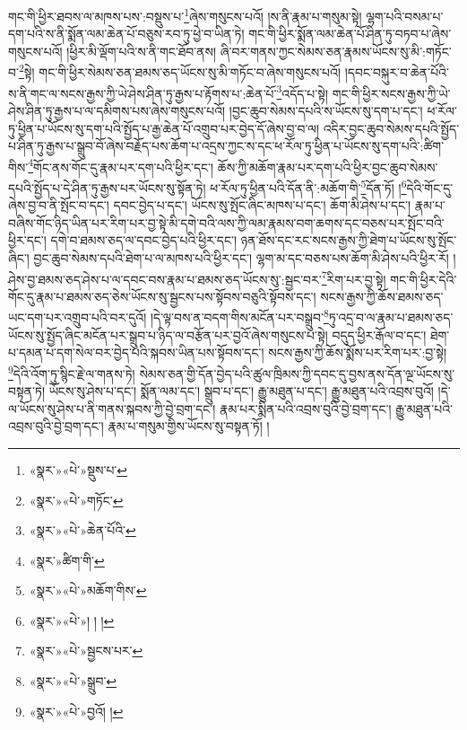 གང་གི་ཕྱིར་ཐབས་ལ་མཁས་པས་:བསྡུས་པ་\footnote{«སྣར་»«པེ་»སྡུས་པ་}ཞེས་གསུངས་པའོ། །ས་ནི་རྣམ་པ་གསུམ་སྟེ། ལྷག་པའི་བསམ་པ་དག་པའི་ས་ནི་སྨོན་ལམ་ཆེན་པོ་བཅུས་རབ་ཏུ་ཕྱེ་བ་ཡིན་ཏེ། གང་གི་ཕྱིར་སྨོན་ལམ་ཆེན་པོ་ཤིན་ཏུ་བཏབ་པ་ཞེས་གསུངས་པའོ། །ཕྱིར་མི་ལྡོག་པའི་ས་ནི་གང་ཐོབ་ནས། ཞི་བར་གནས་ཀྱང་སེམས་ཅན་རྣམས་ཡོངས་སུ་མི་:གཏོང་བ་\footnote{«སྣར་»«པེ་»གཏོང་}སྟེ། གང་གི་ཕྱིར་སེམས་ཅན་ཐམས་ཅད་ཡོངས་སུ་མི་གཏོང་བ་ཞེས་གསུངས་པའོ། །དབང་བསྐུར་བ་ཆེན་པོའི་ས་ནི་གང་ལ་སངས་རྒྱས་ཀྱི་ཡེ་ཤེས་ཤིན་ཏུ་རྒྱས་པ་རྟོགས་པ་:ཆེན་པོ་\footnote{«སྣར་»«པེ་»ཆེན་པོའི་}འདོད་པ་སྟེ། གང་གི་ཕྱིར་སངས་རྒྱས་ཀྱི་ཡེ་ཤེས་ཤིན་ཏུ་རྒྱས་པ་ལ་དམིགས་པས་ཞེས་གསུངས་པའོ། །བྱང་ཆུབ་སེམས་དཔའི་ས་ཡོངས་སུ་དག་པ་དང་། ཕ་རོལ་ཏུ་ཕྱིན་པ་ཡོངས་སུ་དག་པའི་སྤྱོད་པ་རྒྱ་ཆེན་པོ་འགྲུབ་པར་བྱེད་དོ་ཞེས་བྱ་བ་ལ། འདིར་བྱང་ཆུབ་སེམས་དཔའི་སྤྱོད་པ་ཤིན་ཏུ་རྒྱས་པ་སྒྲུབ་བོ་ཞེས་བརྗོད་པས་ཆོག་པ་འདྲས་ཀྱང་ས་དང་ཕ་རོལ་ཏུ་ཕྱིན་པ་ཡོངས་སུ་དག་པའི་:ཚིག་གིས་\footnote{«སྣར་»ཚིག་གི་}གོང་ནས་གོང་དུ་རྣམ་པར་དག་པའི་ཕྱིར་དང་། ཆོས་ཀྱི་མཆོག་རྣམ་པར་དག་པའི་ཕྱིར་བྱང་ཆུབ་སེམས་དཔའི་སྤྱོད་པ་དེ་ཤིན་ཏུ་རྒྱས་པར་ཡོངས་སུ་སྟོན་ཏེ། ཕ་རོལ་ཏུ་ཕྱིན་པའི་དོན་ནི་:མཆོག་གི་\footnote{«སྣར་»«པེ་»མཆོག་གིས་}དོན་ཏོ། །\footnote{«སྣར་»«པེ་»། ། །}དེའི་གོང་དུ་ཞེས་བྱ་བ་ནི་སྤོང་བ་དང་། དབང་བྱེད་པ་དང་། ཡོངས་སུ་སྤོང་ཞིང་མཁས་པ་དང་། ཆོག་མི་ཤེས་པ་དང་། རྣམ་པ་བཞིས་གོང་ཉིད་ཡིན་པར་རིག་པར་བྱ་སྟེ་མི་དགེ་བའི་ལས་ཀྱི་ལམ་རྣམས་བག་ཆགས་དང་བཅས་པར་སྤོང་བའི་ཕྱིར་དང་། དགེ་བ་ཐམས་ཅད་ལ་དབང་བྱེད་པའི་ཕྱིར་དང་། ཉན་ཐོས་དང་རང་སངས་རྒྱས་ཀྱི་ཐེག་པ་ཡོངས་སུ་སྤོང་ཞིང་། བྱང་ཆུབ་སེམས་དཔའི་ཐེག་པ་ལ་མཁས་པའི་ཕྱིར་དང་། ལྷག་མ་དང་བཅས་པས་ཆོག་མི་ཤེས་པའི་ཕྱིར་རོ། །ཤེས་བྱ་ཐམས་ཅད་ཤེས་པ་ལ་དབང་བས་རྣམ་པ་ཐམས་ཅད་ཡོངས་སུ་:སྦྱང་བར་\footnote{«སྣར་»«པེ་»སྦྱངས་པར་}རིག་པར་བྱ་སྟེ། གང་གི་ཕྱིར་དེའི་གོང་དུ་རྣམ་པ་ཐམས་ཅད་ཅེས་ཡོངས་སུ་སྦྱངས་པས་སྟོབས་བཅུའི་སྟོབས་དང་། སངས་རྒྱས་ཀྱི་ཆོས་ཐམས་ཅད་ཡང་དག་པར་འགྲུབ་པའི་བར་དུའོ། །དེ་ལྟ་བས་ན་བདག་གིས་མངོན་པར་བསྒྲུབ་\footnote{«སྣར་»«པེ་»སྒྲུབ་}ཏུ་འདྲ་བ་ལ་རྣམ་པ་ཐམས་ཅད་ཡོངས་སུ་སྤྱོད་ཞིང་མངོན་པར་སྒྲུབ་པ་ཉིད་ལ་བརྩོན་པར་བྱའོ་ཞེས་གསུངས་པ་སྟེ། བདུད་ཕྱིར་རྒོལ་བ་དང་། ཐེག་པ་དམན་པ་དག་སེལ་བར་བྱེད་པའི་སྐབས་ཡིན་པས་སྟོབས་དང་། སངས་རྒྱས་ཀྱི་ཆོས་སྨོས་པར་རིག་པར་:བྱ་སྟེ། \footnote{«སྣར་»«པེ་»བྱའོ། ། }དེའི་འོག་ཏུ་སྙིང་རྗེ་ལ་གནས་ཏེ། སེམས་ཅན་གྱི་དོན་བྱེད་པའི་ཚུལ་ཁྲིམས་ཀྱི་དབང་དུ་བྱས་ནས་དོན་ལྔ་ཡོངས་སུ་བསྟན་ཏེ། ཡོངས་སུ་ཤེས་པ་དང་། སྨོན་ལམ་དང་། སྒྲུབ་པ་དང་། རྒྱུ་མཐུན་པ་དང་། རྒྱུ་མཐུན་པའི་འབྲས་བུའོ། །དེ་ལ་ཡོངས་སུ་ཤེས་པ་ནི་གནས་སྐབས་ཀྱི་བྱེ་བྲག་དང་། རྣམ་པར་སྨིན་པའི་འབྲས་བུའི་བྱེ་བྲག་དང་། རྒྱུ་མཐུན་པའི་འབྲས་བུའི་བྱེ་བྲག་དང་། རྣམ་པ་གསུམ་གྱིས་ཡོངས་སུ་བསྟན་ཏོ། །

